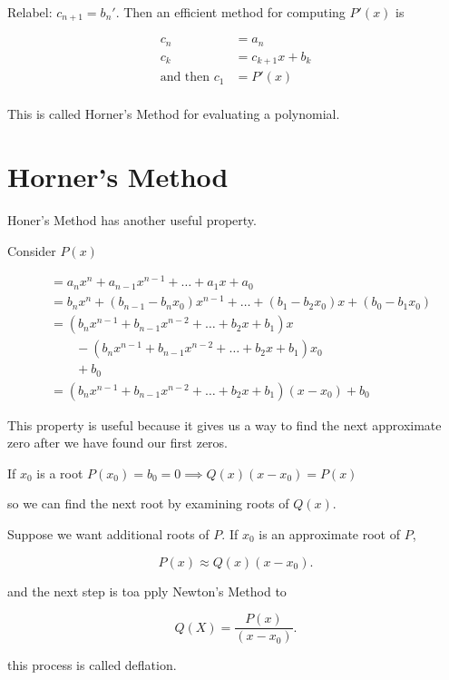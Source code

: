 Relabel: $c_{n+1} = b_n'$. Then an efficient method for computing $P'(x)$ is

\begin{align*}
  c_n &= a_n \\
  c_k &=  c_{k+1}x + b_{k} \\
  \text{and then } c_1 &= P'(x) \\
\end{align*}

This is called Horner's Method for evaluating a polynomial.

\section{Horner's Method}

Honer's Method has another useful property. 

Consider $P(x)$

\begin{align*}
    &= a_n x^n + a_{n-1} x^{n-1} + \dots + a_1 x + a_0 \\
    &= b_n x^n + (b_{n-1} - b_n x_0) x^{n-1} + \dots + (b_1 - b_2 x_0) x + (b_0 - b_1 x_0) \\
    &= (b_n x^{n-1} + b_{n-1} x^{n-2} + \dots + b_2 x + b_1) x \\
    &\qquad - (b_n x^{n-1} + b_{n-1} x^{n-2} + \dots + b_2 x + b_1) x_0 \\
    &\qquad + b_0 \\
    &= (b_n x^{n-1} + b_{n-1} x^{n-2} + \dots + b_2 x + b_1) (x - x_0) + b_0
\end{align*}

This property is useful because it gives us a way to find the next approximate
zero after we have found our first zeros.

\ie If $x_0$ is a root $P(x_0) = b_0 = 0\implies Q(x) (x-x_0) = P(x)$

so we can find the next root by examining roots of $Q(x)$.

Suppose we want additional roots of $P$. If $x_0$ is an approximate root of $P$,

\[
  P(x) \approx Q(x) (x-x_0) 
.\]

and the next step is toa pply Newton's Method to 

\[
  \displaystyle Q(X) = \frac{P(x)}{(x-x_0)}
.\]

this process is called deflation.


